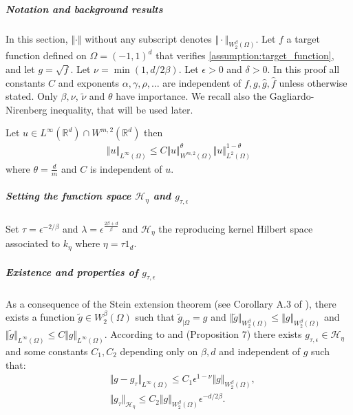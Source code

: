 \subparagraph{Notation and background results} In this section, $\Vert \cdot \Vert$ without any subscript denotes $\Vert \cdot\Vert_{W_2^\beta(\Omega)}$. Let $f$ a target function defined on $\Omega = (-1, 1)^d$ that verifies \cref{assumption:target_function}, and let $g = \sqrt{f}$. Let $\nu = \min(1, d/2\beta)$. Let $\epsilon > 0$ and $\delta > 0$. In this proof all constants $C$ and exponents $\alpha, \gamma, \rho, \ldots$ are independent of $f, g, \hat g, \hat f$ unless otherwise stated. Only $\beta, \nu$, $\tilde \nu$ and $\theta$ have importance. We recall also the Gagliardo-Nirenberg inequality, that will be used later.
\begin{lemma}\label{lemma:gargliano}
Let $u\in L^\infty(\mathbb R^d)\cap W^{m, 2}(\mathbb R^d)$ then
    \begin{align}
        \Vert u \Vert_{L^\infty(\Omega)} \leq C \Vert u\Vert_{W^{m, 2}(\Omega)}^\theta \Vert u\Vert_{L^2(\Omega)}^{1-\theta}
    \end{align}
    where $\theta = \frac{d}{m}$ and $C$ is independent of $u$.
\end{lemma}


\subparagraph{Setting the function space $\mathcal H_\eta$ and $g_{\tau, \epsilon}$}
Set $\tau = \epsilon^{-2/\beta}$ and $\lambda = \epsilon^{\frac{2\beta + d}{\beta}}$ and $\mathcal H_\eta$ the reproducing kernel Hilbert space associated to $k_\eta$ where $\eta = \tau 1_d$.

\subparagraph{Existence and properties of $g_{\tau, \epsilon}$}
As a consequence of the Stein extension theorem (see Corollary A.3 of \cite{rudi2021psd}), there exists a function $\tilde g \in W^\beta_2(\Omega)$ such that $\tilde g_{\vert \Omega}=g$ and $\Vert \tilde g\Vert_{W_2^\beta(\Omega)} \leq\Vert g\Vert_{W_2^\beta(\Omega)}$ and $\Vert \tilde g\Vert_{L^\infty(\Omega)}\leq C\Vert g\Vert_{L^\infty(\Omega)}$.
%
According to \cite{rudi2021psd} and \cite{sampling-ulysse} (Proposition 7) there exists $g_{\tau, \epsilon}\in\mathcal H_\eta$ and some constants $C_1, C_2$ depending only on $\beta, d$ and independent of $g$ such that:
\begin{align}
&\Vert g - g_\tau \Vert_{L^\infty(\Omega)} \leq C_1 \epsilon^{1- \nu}\Vert g\Vert_{W^\beta_2(\Omega)}\label{eq:g-g-tau},\\
&\Vert g_\tau \Vert_{\mathcal H_\eta}\leq C_2 \Vert g\Vert_{W^\beta_2(\Omega)}\epsilon^{-d/2\beta}\label{eq:g-tau}.
\end{align}

